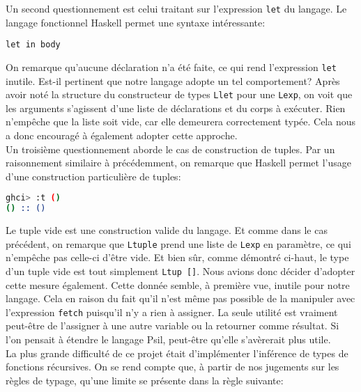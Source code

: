 \documentclass[10pt, titlepage]{article}
\begin{document}
Un second questionnement est celui traitant sur l'expression \texttt{let} du
langage. Le langage fonctionnel Haskell permet une syntaxe intéressante:
\begin{lstlisting}
let in body
\end{lstlisting}
On remarque qu'aucune déclaration n'a été faite, ce qui rend l'expression
\texttt{let} inutile. Est-il pertinent que notre langage adopte un tel 
comportement? Après avoir noté la structure du constructeur de types
\texttt{Llet} pour une \texttt{Lexp}, on voit que les arguments s'agissent
d'une liste de déclarations et du corps à exécuter. Rien n'empêche que la liste
soit vide, car elle demeurera correctement typée. Cela nous a donc encouragé à
également adopter cette approche. \\

Un troisième questionnement aborde le cas de construction de tuples. Par un
raisonnement similaire à précédemment, on remarque que Haskell permet l'usage
d'une construction particulière de tuples:
\begin{lstlisting}[language=bash]
ghci> :t ()
() :: ()
\end{lstlisting}
Le tuple vide est une construction valide du langage. Et comme dans le cas
précédent, on remarque que \texttt{Ltuple} prend une liste de \texttt{Lexp} en
paramètre, ce qui n'empêche pas celle-ci d'être vide. Et bien sûr, comme
démontré ci-haut, le type d'un tuple vide est tout simplement \texttt{Ltup []}.
Nous avions donc décider d'adopter cette mesure également. Cette donnée semble,
à première vue, inutile pour notre langage. Cela en raison du fait qu'il n'est
même pas possible de la manipuler avec l'expression \texttt{fetch} puisqu'il
n'y a rien à assigner. La seule utilité est vraiment peut-être de l'assigner à
une autre variable ou la retourner comme résultat. Si l'on pensait à étendre
le langage Psil, peut-être qu'elle s'avèrerait plus utile. \\

La plus grande difficulté de ce projet était d'implémenter l'inférence de types
de fonctions récursives. On se rend compte que, à partir de nos jugements sur
les règles de typage, qu'une limite se présente dans la règle suivante:
\end{document}
